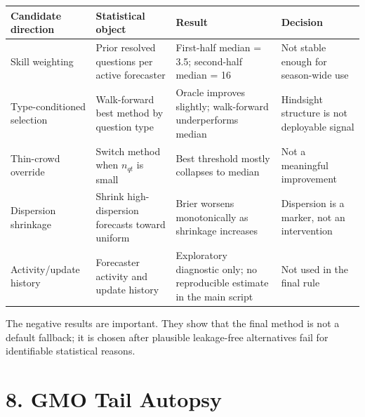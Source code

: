 \documentclass[
]{article}
\newcounter{none} %
\begin{document}
{\def\LTcaptype{none} %
\begin{longtable}[]{@{}
  >{\raggedright\arraybackslash}p{}
  >{\raggedright\arraybackslash}p{}
  >{\raggedright\arraybackslash}p{}
  >{\raggedright\arraybackslash}p{}@{}}
\toprule\noalign{}
\begin{minipage}[b]{\linewidth}\raggedright
Candidate direction
\end{minipage} & \begin{minipage}[b]{\linewidth}\raggedright
Statistical object
\end{minipage} & \begin{minipage}[b]{\linewidth}\raggedright
Result
\end{minipage} & \begin{minipage}[b]{\linewidth}\raggedright
Decision
\end{minipage} \\
\midrule\noalign{}
\endhead
\bottomrule\noalign{}
\endlastfoot
Skill weighting & Prior resolved questions per active forecaster &
First-half median = 3.5; second-half median = 16 & Not stable enough for
season-wide use \\
Type-conditioned selection & Walk-forward best method by question type &
Oracle improves slightly; walk-forward underperforms median & Hindsight
structure is not deployable signal \\
Thin-crowd override & Switch method when \(n_{qt}\) is small & Best
threshold mostly collapses to median & Not a meaningful improvement \\
Dispersion shrinkage & Shrink high-dispersion forecasts toward uniform &
Brier worsens monotonically as shrinkage increases & Dispersion is a
marker, not an intervention \\
Activity/update history & Forecaster activity and update history &
Exploratory diagnostic only; no reproducible estimate in the main script &
Not used in the final rule \\
\end{longtable}
}

The negative results are important. They show that the final method is
not a default fallback; it is chosen after plausible leakage-free
alternatives fail for identifiable statistical reasons.

\section{8. GMO Tail Autopsy}\label{gmo-tail-autopsy}
\end{document}
